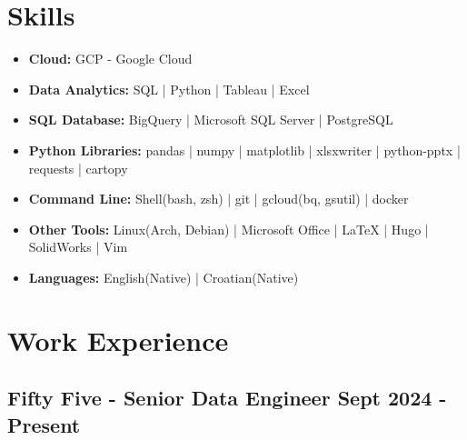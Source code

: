 \documentclass[a4paper,9pt]{article}
\begin{document}
\section*{Skills}
\begin{itemize}[noitemsep]
    \item[] \faCloud \hspace{1mm} \textbf{Cloud:} \hspace{16.7mm} GCP - Google Cloud
    \item[] \faTachometer \hspace{1mm} \textbf{Data Analytics:} \hspace{3.5mm}  SQL |  Python | Tableau |  Excel
    \item[] \faDatabase \hspace{1mm} \textbf{SQL Database:} \hspace{4.4mm} BigQuery |  Microsoft SQL Server |  PostgreSQL
    \item[] \faCog \hspace{1mm} \textbf{Python Libraries:} \hspace{0.4mm} pandas | numpy | matplotlib | xlsxwriter | python-pptx | requests | cartopy
    \item[] \faTerminal \hspace{1mm} \textbf{Command Line:} \hspace{2.5mm} Shell(bash, zsh) | git |  gcloud(bq, gsutil) | docker
    \item[] \faWrench \hspace{1mm} \textbf{Other Tools:} \hspace{8mm}  Linux(Arch, Debian) | Microsoft Office |  LaTeX  | Hugo | SolidWorks | Vim
    \item[] \faLanguage \hspace{1mm} \textbf{Languages:} \hspace{9.5mm} English(Native) |  Croatian(Native)
\end{itemize}

\section*{Work Experience}

\subsection*{\textbf{Fifty Five - Senior Data Engineer} \hfill  Sept 2024 - Present}
\end{document}
